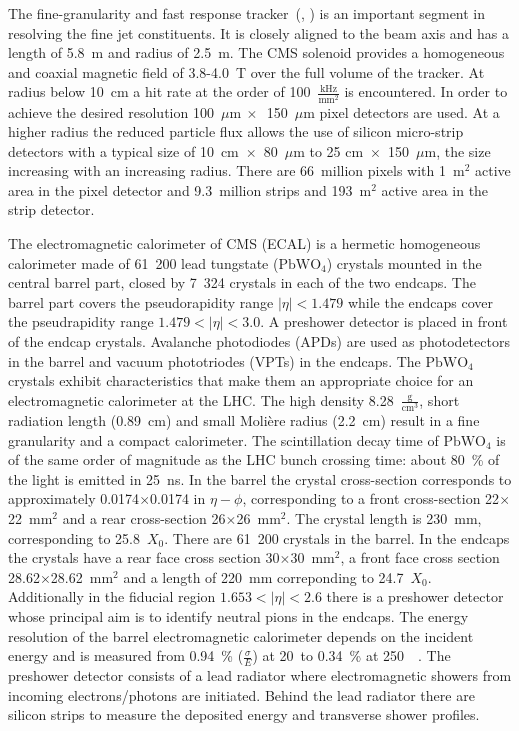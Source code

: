The fine-granularity and fast response tracker~(\cite{Karimaki:368412}, \cite{tracker_addendum}) is an important segment in resolving the fine jet constituents. It is closely aligned to the beam axis and has a length of 5.8~m and radius of 2.5~m. The CMS solenoid provides a homogeneous and coaxial magnetic field of 3.8-4.0~T over the full volume of the tracker. At radius below 10~cm a hit rate at the order of 100~$\frac{\text{kHz}}{\text{mm}^2}$ is encountered. In order to achieve the desired resolution 100~$\mu\text{m}~\times$~150~$\mu\text{m}$ pixel detectors are used. At a higher radius the reduced particle flux allows the use of silicon micro-strip detectors with a typical size of 10~cm~$\times$~80~$\mu$m to 25 cm~$\times$~150~$\mu$m, the size increasing with an increasing radius. There are 66~million pixels with 1~$\text{m}^2$ active area in the pixel detector and 9.3~million strips and 193~${\text{m}}^2$ active area in the strip detector.

The electromagnetic calorimeter of CMS (ECAL) is a hermetic homogeneous calorimeter made of 61~200 lead tungstate ($\text{PbWO}_{4}$) crystals mounted in the central barrel part, closed by 7~324 crystals in each of the two endcaps. The barrel part covers the pseudorapidity range $\left|\eta\right|<1.479$ while the endcaps cover the pseudrapidity range $1.479<\left|\eta\right|<3.0$. A preshower detector is placed in front of the endcap crystals. Avalanche photodiodes (APDs) are used as photodetectors in the barrel and vacuum phototriodes (VPTs) in the endcaps. The $\text{PbWO}_{4}$ crystals exhibit characteristics that make them an appropriate choice for an electromagnetic calorimeter at the LHC. The high density 8.28~$\frac{\text{g}}{\text{cm}^3}$, short radiation length (0.89~cm)  and small Molière radius (2.2~cm) result in a fine granularity and a compact calorimeter. The scintillation decay time of $\text{PbWO}_{4}$ is of the same order of magnitude as the LHC bunch crossing time: about 80~\% of the light is emitted in 25~ns. In the barrel the crystal cross-section corresponds to approximately 0.0174$\times$0.0174 in $\eta-\phi$, corresponding to a front cross-section 22$\times$22~$\text{mm}^2$ and a rear cross-section 26$\times$26~$\text{mm}^2$. The crystal length is 230~mm, corresponding to 25.8~$X_{0}$. There are 61~200 crystals in the barrel. In the endcaps the crystals have a rear face cross section 30$\times$30~$\text{mm}^2$, a front face cross section 28.62$\times$28.62~$\text{mm}^2$ and a length of 220~mm correponding to 24.7~$X_{0}$. Additionally in the fiducial region $1.653<\left|\eta\right|<2.6$ there is a preshower detector whose principal aim is to identify neutral pions in the endcaps. The energy resolution of the barrel electromagnetic calorimeter depends on the incident energy and is measured from 0.94~\% ($\frac{\sigma}{E}$) at 20~\GeV to 0.34~\% at 250~\GeV~\cite{Adzic:2007mi}. The preshower detector consists of a lead radiator where electromagnetic showers from incoming electrons/photons are initiated. Behind the lead radiator there are silicon strips to measure the deposited energy and transverse shower profiles.

